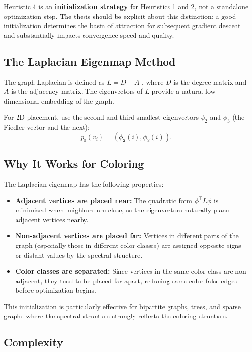 \documentclass[11pt]{article}
\begin{document}
Heuristic 4 is an \textbf{initialization strategy} for Heuristics 1 and 2, not
a standalone optimization step. The thesis should be explicit about this
distinction: a good initialization determines the basin of attraction for
subsequent gradient descent and substantially impacts convergence speed and
quality.

\subsection{The Laplacian Eigenmap Method}

The graph Laplacian is defined as $L = D - A$ \cite{Chung1997}, where $D$ is the degree matrix
and $A$ is the adjacency matrix. The eigenvectors of $L$ provide a natural
low-dimensional embedding of the graph.

For 2D placement, use the second and third smallest eigenvectors $\phi_2$ and
$\phi_3$ (the Fiedler vector \cite{Fiedler1973} and the next):
\[
  p_0(v_i) = (\phi_2(i), \phi_3(i)).
\]

\subsection{Why It Works for Coloring}

The Laplacian eigenmap \cite{Belkin2003} has the following properties:
\begin{itemize}
  \item \textbf{Adjacent vertices are placed near:} The quadratic form
    $\phi^\top L \phi$ is minimized when neighbors are close, so the eigenvectors
    naturally place adjacent vertices nearby.
  \item \textbf{Non-adjacent vertices are placed far:} Vertices in different
    parts of the graph (especially those in different color classes) are
    assigned opposite signs or distant values by the spectral structure.
  \item \textbf{Color classes are separated:} Since vertices in the same color
    class are non-adjacent, they tend to be placed far apart, reducing
    same-color false edges before optimization begins.
\end{itemize}

This initialization is particularly effective for bipartite graphs, trees, and
sparse graphs where the spectral structure strongly reflects the coloring
structure.

\subsection{Complexity}
\end{document}
